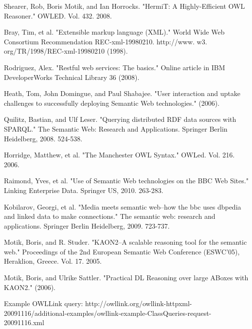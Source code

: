 \documentclass{article}
\begin{document}
\begin{thebibliography}{9}
  Shearer, Rob, Boris Motik, and Ian Horrocks. "HermiT: A Highly-Efficient OWL
  Reasoner." OWLED. Vol. 432. 2008.

  Bray, Tim, et al. 
  "Extensible markup language (XML)." 
  World Wide Web Consortium Recommendation REC-xml-19980210. 
  http://www. w3. org/TR/1998/REC-xml-19980210
  (1998).

  Rodriguez, Alex. 
  "Restful web services: The basics." 
  Online article in IBM DeveloperWorks Technical Library 36 (2008).

  Heath, Tom, John Domingue, and Paul Shabajee.
  "User interaction and uptake challenges to successfully deploying Semantic Web technologies." (2006).

  Quilitz, Bastian, and Ulf Leser. 
  "Querying distributed RDF data sources with SPARQL." 
  The Semantic Web: Research and Applications. Springer Berlin Heidelberg, 
  2008. 524-538.

  Horridge, Matthew, et al. "The Manchester OWL Syntax." OWLed. Vol. 216. 2006.

  Raimond, Yves, et al. "Use of Semantic Web technologies on the BBC Web Sites."
  Linking Enterprise Data. Springer US, 2010. 263-283.

  Kobilarov, Georgi, et al. "Media meets semantic web–how the bbc uses dbpedia
  and linked data to make connections." The semantic web: research and
  applications. Springer Berlin Heidelberg, 2009. 723-737.

  Motik, Boris, and R. Studer. "KAON2–A scalable reasoning tool for the semantic
  web." Proceedings of the 2nd European Semantic Web Conference (ESWC’05),
  Heraklion, Greece. Vol. 17. 2005.

  Motik, Boris, and Ulrike Sattler. "Practical DL Reasoning over large ABoxes
  with KAON2." (2006).

Example OWLLink query:
http://owllink.org/owllink-httpxml-20091116/additional-examples/owllink-example-ClassQueries-request-20091116.xml

\end{thebibliography}
\end{document}
